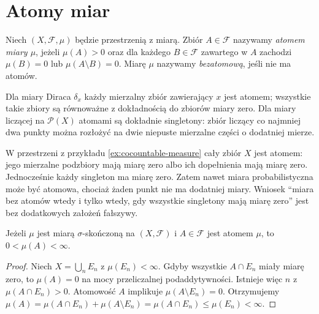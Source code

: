 \section{Atomy miar}
\label{sec:atoms}

\begin{definicja}
\label{def:atom}
Niech $(X,\mathcal F,\mu)$ będzie przestrzenią z miarą.
Zbiór $A\in\mathcal F$ nazywamy \emph{atomem miary $\mu$},
jeżeli $\mu(A)>0$ oraz dla każdego $B\in\mathcal F$
zawartego w $A$ zachodzi $\mu(B)=0$ lub
$\mu(A\setminus B)=0$.
Miarę $\mu$ nazywamy \emph{bezatomową}, jeśli nie ma atomów.
\end{definicja}

\begin{przyklad}
Dla miary Diraca $\delta_x$ każdy mierzalny zbiór
zawierający $x$ jest atomem; wszystkie takie zbiory
są równoważne z dokładnością do zbiorów miary zero.
Dla miary liczącej na $\mathcal P(X)$ atomami są
dokładnie singletony: zbiór liczący co najmniej dwa punkty
można rozłożyć na dwie niepuste mierzalne części
o dodatniej mierze.
\end{przyklad}

\begin{przyklad}
W przestrzeni z przykładu \ref{ex:cocountable-measure}
cały zbiór $X$ jest atomem: jego mierzalne podzbiory
mają miarę zero albo ich dopełnienia mają miarę zero.
Jednocześnie każdy singleton ma miarę zero.
Zatem nawet miara probabilistyczna może być atomowa,
chociaż żaden punkt nie ma dodatniej miary. Wniosek
``miara bez atomów wtedy i tylko wtedy, gdy wszystkie
singletony mają miarę zero'' jest bez dodatkowych
założeń fałszywy.
\end{przyklad}

\begin{twierdzenie}
\label{thm:atom-sigma-finite}
Jeżeli $\mu$ jest miarą $\sigma$-skończoną na
$(X,\mathcal F)$ i $A\in\mathcal F$ jest atomem $\mu$,
to $0<\mu(A)<\infty$.
\end{twierdzenie}
\begin{proof}
Niech $X=\bigcup_nE_n$ z $\mu(E_n)<\infty$.
Gdyby wszystkie $A\cap E_n$ miały miarę zero,
to $\mu(A)=0$ na mocy przeliczalnej podaddytywności.
Istnieje więc $n$ z $\mu(A\cap E_n)>0$.
Atomowość $A$ implikuje $\mu(A\setminus E_n)=0$.
Otrzymujemy
$\mu(A)=\mu(A\cap E_n)+\mu(A\setminus E_n)
=\mu(A\cap E_n)\leq\mu(E_n)<\infty$.
\end{proof}

